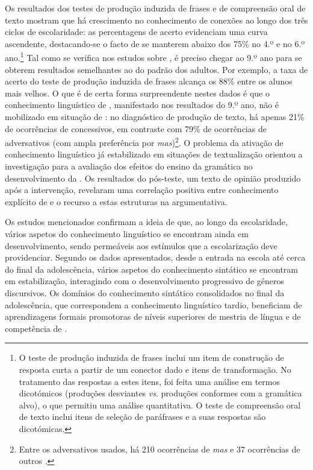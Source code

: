 \documentclass[output=paper]{LSP/langsci}
\begin{document}
Os resultados dos testes de produção induzida de frases e de compreensão oral de texto mostram que há crescimento no conhecimento de conexões  ao longo dos três ciclos de escolaridade: as percentagens de acerto evidenciam uma curva ascendente, destacando‑se o facto de se manterem abaixo dos 75\% no 4.º e no 6.º ano.\footnote{O teste de produção induzida de frases inclui um item de construção de resposta curta a partir de um conector dado e itens de transformação. No tratamento das respostas a estes itens, foi feita uma análise em termos dicotómicos (produções desviantes \textit{vs}. produções conformes com a gramática alvo), o que permitiu uma análise quantitativa. O teste de compreensão oral de texto inclui itens de seleção de paráfrases e a suas respostas são dicotómicas.} Tal como se verifica nos estudos sobre  \citep{fontes2008,valente2008}, é preciso chegar ao 9.º ano para se obterem resultados semelhantes ao do padrão dos adultos. Por exemplo, a taxa de acerto do teste de produção induzida de frases alcança os 88\% entre os alunos mais velhos. O que é de certa forma surpreendente nestes dados é que o conhecimento linguístico de , manifestado nos resultados do 9.º ano, não é mobilizado em situação de : no diagnóstico de produção de texto, há apenas 21\% de ocorrências de  concessivos, em contraste com 79\% de ocorrências de  adversativos (com ampla preferência por \textit{mas})\footnote{Entre os  adversativos usados, há 210 ocorrências de \textit{mas} e 37 ocorrências de outros .}. O problema da ativação de conhecimento linguístico já estabilizado em situações de textualização orientou a investigação para a avaliação dos efeitos do ensino da gramática no desenvolvimento da . Os resultados do pós-teste, um texto de opinião produzido após a intervenção, revelaram uma correlação positiva entre conhecimento explícito de  e o recurso a estas estruturas na  argumentativa.

Os estudos mencionados confirmam a ideia de que, ao longo da escolaridade, vários aspetos do conhecimento linguístico se encontram ainda em desenvolvimento, sendo permeáveis aos estímulos que a escolarização deve providenciar. Segundo os dados apresentados, desde a entrada na escola até cerca do final da adolescência, vários aspetos do conhecimento sintático se encontram em estabilização, interagindo com o desenvolvimento progressivo de géneros discursivos. Os domínios do conhecimento sintático consolidados no final da adolescência, que correspondem a conhecimento linguístico tardio, beneficiam de aprendizagens formais promotoras de níveis superiores de mestria de língua e de competência de .
\end{document}
